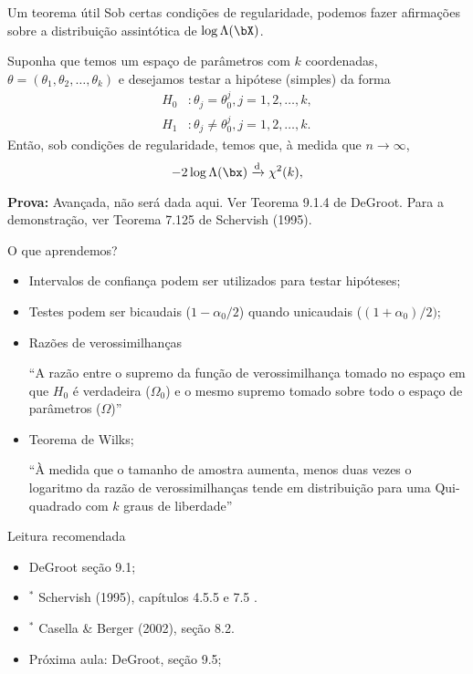\begin{frame}{Um teorema útil}
 Sob certas condições de regularidade, podemos fazer afirmações sobre a distribuição assintótica de $\log\Lambda(\bX)$.
 \begin{theo}
 \label{thm:Wilks}
  Suponha que temos um espaço de parâmetros com $k$ coordenadas, $\theta = (\theta_1, \theta_2, \ldots, \theta_k)$ e desejamos testar a hipótese (simples) da forma
   \begin{align*}
   H_0 &:  \theta_j = \theta_0^{j}, j = 1, 2, \ldots, k, \\
   H_1 &:  \theta_j \neq \theta_0^{j}, j = 1, 2, \ldots, k. 
  \end{align*}
  Então, sob condições de regularidade, temos que, à medida que $n \to \infty$,
  \begin{equation*}
   -2\log\Lambda(\bx) \xrightarrow{\text{d}} \chi^{2} (k), 
  \end{equation*}
 \end{theo}
\textbf{Prova:} Avançada, não será dada aqui.
Ver Teorema 9.1.4 de DeGroot.
Para a demonstração, ver Teorema 7.125 de Schervish (1995).
\end{frame}

\begin{frame}{O que aprendemos?}
\begin{itemize}

  \item[\faLightbulbO] Intervalos de confiança podem ser utilizados para testar hipóteses;
  \item[\faLightbulbO] Testes podem ser bicaudais ($1-\alpha_0/2$) quando unicaudais ($(1 + \alpha_0)/2)$;
  \item[\faLightbulbO] Razões de verossimilhanças
  
  ``A razão entre o supremo da função de verossimilhança tomado no espaço em que $H_0$ é verdadeira ($\Omega_0$) e o mesmo supremo tomado sobre todo o espaço de parâmetros ($\Omega$)''
  
  \item[\faLightbulbO] Teorema de Wilks; 
  
  ``À medida que o tamanho de amostra aumenta, menos duas vezes o logaritmo da razão de verossimilhanças tende em distribuição para uma Qui-quadrado com $k$ graus de liberdade''
  \end{itemize}
 \end{frame}

\begin{frame}{Leitura recomendada}
\begin{itemize}
 \item[\faBook] DeGroot seção 9.1;
 \item[\faBook] $^\ast$ Schervish (1995), capítulos 4.5.5 e 7.5 .
 \item[\faBook] $^\ast$ Casella \& Berger (2002), seção 8.2.
 \item[\faForward] Próxima aula: DeGroot, seção 9.5;
 \end{itemize} 
\end{frame}
